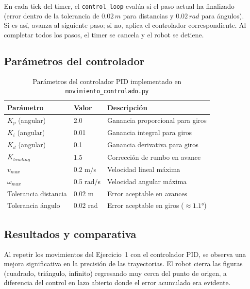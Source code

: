 En cada tick del timer, el \texttt{control\_loop} evalúa si el paso actual ha finalizado (error dentro de la tolerancia de $0.02\,m$ para distancias y $0.02\,rad$ para ángulos). Si es así, avanza al siguiente paso; si no, aplica el controlador correspondiente. Al completar todos los pasos, el timer se cancela y el robot se detiene.

\subsection*{Parámetros del controlador}

\begin{table}[H]
	\centering
	\begin{tabular}{lll}
		\toprule
		\textbf{Parámetro}      & \textbf{Valor} & \textbf{Descripción} \\
		\midrule
		$K_p$ (angular)         & 2.0            & Ganancia proporcional para giros \\
		$K_i$ (angular)         & 0.01           & Ganancia integral para giros \\
		$K_d$ (angular)         & 0.1            & Ganancia derivativa para giros \\
		$K_{heading}$           & 1.5            & Corrección de rumbo en avance \\
		$v_{max}$               & 0.2 m/s        & Velocidad lineal máxima \\
		$\omega_{max}$          & 0.5 rad/s      & Velocidad angular máxima \\
		Tolerancia distancia    & 0.02 m         & Error aceptable en avances \\
		Tolerancia ángulo       & 0.02 rad       & Error aceptable en giros ($\approx 1.1°$) \\
		\bottomrule
	\end{tabular}
	\caption{Parámetros del controlador PID implementado en \texttt{movimiento\_controlado.py}}
\end{table}

\subsection*{Resultados y comparativa}

Al repetir los movimientos del Ejercicio~1 con el controlador PID, se observa una mejora significativa en la precisión de las trayectorias. El robot cierra las figuras (cuadrado, triángulo, infinito) regresando muy cerca del punto de origen, a diferencia del control en lazo abierto donde el error acumulado era evidente.

